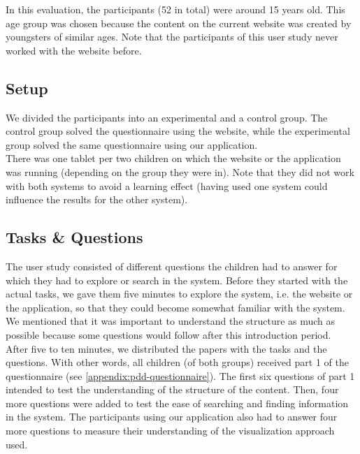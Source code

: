 In this evaluation, the participants (52 in total) were around 15 years old. This age group was chosen because the content on the current website was created by youngsters of similar ages. Note that the participants of this user study never worked with the website before.

\subsection{Setup}
We divided the participants into an experimental and a control group. The control group solved the questionnaire using the website, while the experimental group solved the same questionnaire using our application.\\

There was one tablet per two children on which the website or the application was running (depending on the group they were in). Note that they did not work with both systems to avoid a learning effect (having used one system could influence the results for the other system). 

\subsection{Tasks \& Questions}
The user study consisted of different questions the children had to answer for which they had to explore or search in the system. Before they started with the actual tasks, we gave them five minutes to explore the system, i.e. the website or the application, so that they could become somewhat familiar with the system. We mentioned that it was important to understand the structure as much as possible because some questions would follow after this introduction period.\\

After five to ten minutes, we distributed the papers with the tasks and the questions. With other words, all children (of both groups) received part 1 of the questionnaire (see \autoref{appendix:pdd-questionnaire}). The first six questions of part 1 intended to test the understanding of the structure of the content. Then, four more questions were added to test the ease of searching and finding information in the system. The participants using our application also had to answer four more questions to measure their understanding of the visualization approach used.\\

